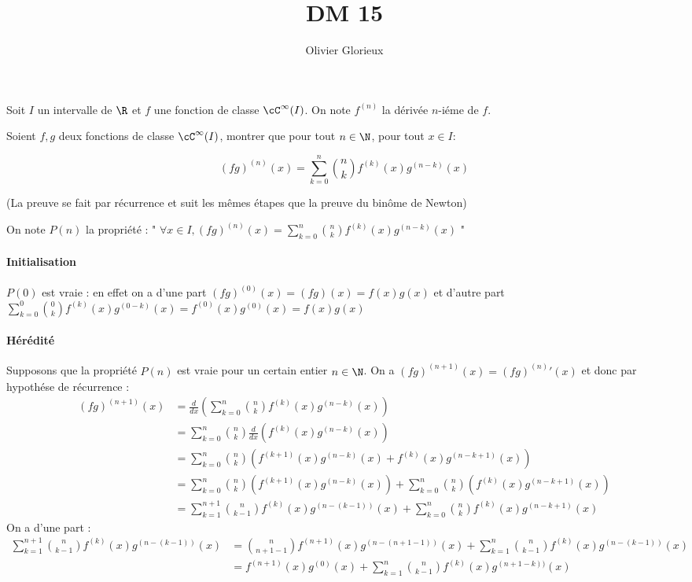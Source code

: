 \documentclass[a4paper, 11pt,reqno]{article}
\author{Olivier Glorieux}
\begin{document}
\title{DM 15}






\begin{exercice}
Soit $I$ un intervalle de $\R$ et 
$f$ une fonction de classe $\cC^{\infty}(I)$. On note $f^{(n)}$ la dérivée $n$-iéme de $f$. 

Soient $f, g $ deux fonctions de classe $\cC^\infty(I)$, montrer que pour tout $n\in \N$, pour tout $x\in I$:

$$(fg)^{(n)}(x)=\sum_{k=0}^n \binom{n}{k} f^{(k)} (x)g^{(n-k)} (x)$$

(La preuve se fait par récurrence et suit les mêmes étapes que la preuve du binôme de Newton)

\end{exercice}
\begin{correction}
On note $P(n)$ la propriété : " $\forall x\in I, (fg)^{(n)}(x)=\sum_{k=0}^n \binom{n}{k} f^{(k)} (x)g^{(n-k)} (x)$ " 

\paragraph{Initialisation}
$P(0)$ est vraie : en effet on a d'une part  $(fg)^{(0)}(x)= (fg)(x)=f(x)g(x)$ et d'autre part 
$\sum_{k=0}^0 \binom{0}{k} f^{(k)} (x)g^{(0-k)} (x)= f^{(0)}(x)g^{(0)} (x) =f(x)g(x)$

\paragraph{Hérédité}
Supposons que la propriété $P(n)$ est vraie pour un certain entier $n\in \N$. On  a
$(fg)^{(n+1)}(x) = {(fg)^{(n)}}'(x) $ et donc par hypothése de récurrence : 
\begin{align*}
(fg)^{(n+1)}(x) &= \frac{d}{dx}\left(\sum_{k=0}^n \binom{n}{k} f^{(k)} (x)g^{(n-k)} (x)\right)\\
						&= \sum_{k=0}^n \binom{n}{k} \frac{d}{dx}\left(f^{(k)} (x)g^{(n-k)} (x)\right)\\
						&= \sum_{k=0}^n \binom{n}{k}\left( f^{(k+1)} (x)g^{(n-k)} (x) + f^{(k)} (x)g^{(n-k+1)} (x)\right)\\
						&=\sum_{k=0}^n \binom{n}{k}\left( f^{(k+1)} (x)g^{(n-k)} (x) \right)+\sum_{k=0}^n \binom{n}{k}\left( f^{(k)} (x)g^{(n-k+1)} (x)\right)\\
						&=\sum_{k=1}^{n+1} \binom{n}{k-1}f^{(k)} (x)g^{(n-(k-1))} (x) +\sum_{k=0}^n \binom{n}{k} f^{(k)} (x)g^{(n-k+1)} (x)
\end{align*}
On a d'une part :
\begin{align*}
\sum_{k=1}^{n+1} \binom{n}{k-1}f^{(k)} (x)g^{(n-(k-1))} (x) &= \binom{n}{n+1-1} f^{(n+1)} (x)g^{(n-(n+1-1))} (x) 
												+\sum_{k=1}^{n}  \binom{n}{k-1}f^{(k)} (x)g^{(n-(k-1))} (x) \\
												&=f^{(n+1)}(x) g^{(0)} (x) + \sum_{k=1}^{n}  \binom{n}{k-1}f^{(k)} (x)g^{(n+1-k))} (x) 
\end{align*}


\end{correction}
\end{document}
